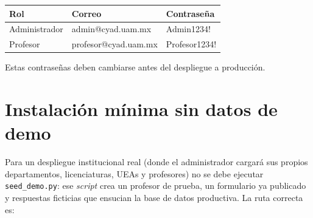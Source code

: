 \documentclass{computacion}
\begin{document}
\begin{longtable}{p{} p{} p{}}
    \toprule
    \textbf{Rol} & \textbf{Correo} & \textbf{Contraseña} \\
    \midrule
    \endhead
    Administrador & admin@cyad.uam.mx & Admin1234! \\
    \midrule
    Profesor & profesor@cyad.uam.mx & Profesor1234! \\
    \bottomrule
\end{longtable}

Estas contraseñas deben cambiarse antes del despliegue a producción.

\section{Instalación mínima sin datos de demo}
\label{sec:install-limpia}

Para un despliegue institucional real (donde el administrador cargará sus propios departamentos, licenciaturas, UEAs y profesores) no se debe ejecutar \texttt{seed\_demo.py}: ese \emph{script} crea un profesor de prueba, un formulario ya publicado y respuestas ficticias que ensucian la base de datos productiva. La ruta correcta es:
\end{document}

